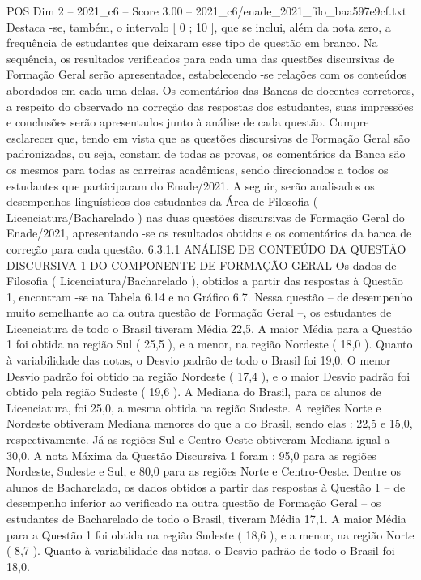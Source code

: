 \begin{textsample}{POS Dim 2 – 2021\_c6 – Score 3.00 – 2021\_c6/enade\_2021\_filo\_baa597e9cf.txt}
Destaca -se, também, o intervalo [ 0 ; 10 ], que se inclui, além da nota zero, a frequência de estudantes que deixaram esse tipo de questão em branco.
Na sequência, os resultados verificados para cada uma das questões discursivas de Formação Geral serão apresentados, estabelecendo -se relações com os conteúdos abordados em cada uma delas.
Os comentários das Bancas de docentes corretores, a respeito do observado na correção das respostas dos estudantes, suas impressões e conclusões serão apresentados junto à análise de cada questão.
Cumpre esclarecer que, tendo em vista que as questões discursivas de Formação Geral são padronizadas, ou seja, constam de todas as provas, os comentários da Banca são os mesmos para todas as carreiras acadêmicas, sendo direcionados a todos os estudantes que participaram do Enade/2021.
A seguir, serão analisados os desempenhos linguísticos dos estudantes da Área de Filosofia ( Licenciatura/Bacharelado ) nas duas questões discursivas de Formação Geral do Enade/2021, apresentando -se os resultados obtidos e os comentários da banca de correção para cada questão. 6.3.1.1 ANÁLISE DE CONTEÚDO DA QUESTÃO DISCURSIVA 1 DO COMPONENTE DE FORMAÇÃO GERAL Os dados de Filosofia ( Licenciatura/Bacharelado ), obtidos a partir das respostas à Questão 1, encontram -se na Tabela 6.14 e no Gráfico 6.7.
Nessa questão – de desempenho muito semelhante ao da outra questão de Formação Geral –, os estudantes de Licenciatura de todo o Brasil tiveram Média 22,5.
A maior Média para a Questão 1 foi obtida na região Sul ( 25,5 ), e a menor, na região Nordeste ( 18,0 ).
Quanto à variabilidade das notas, o Desvio padrão de todo o Brasil foi 19,0.
O menor Desvio padrão foi obtido na região Nordeste ( 17,4 ), e o maior Desvio padrão foi obtido pela região Sudeste ( 19,6 ).
A Mediana do Brasil, para os alunos de Licenciatura, foi 25,0, a mesma obtida na região Sudeste.
A regiões Norte e Nordeste obtiveram Mediana menores do que a do Brasil, sendo elas : 22,5 e 15,0, respectivamente.
Já as regiões Sul e Centro-Oeste obtiveram Mediana igual a 30,0.
A nota Máxima da Questão Discursiva 1 foram : 95,0 para as regiões Nordeste, Sudeste e Sul, e 80,0 para as regiões Norte e Centro-Oeste.
Dentre os alunos de Bacharelado, os dados obtidos a partir das respostas à Questão 1 – de desempenho inferior ao verificado na outra questão de Formação Geral – os estudantes de Bacharelado de todo o Brasil, tiveram Média 17,1.
A maior Média para a Questão 1 foi obtida na região Sudeste ( 18,6 ), e a menor, na região Norte ( 8,7 ).
Quanto à variabilidade das notas, o Desvio padrão de todo o Brasil foi 18,0.

\end{textsample}

